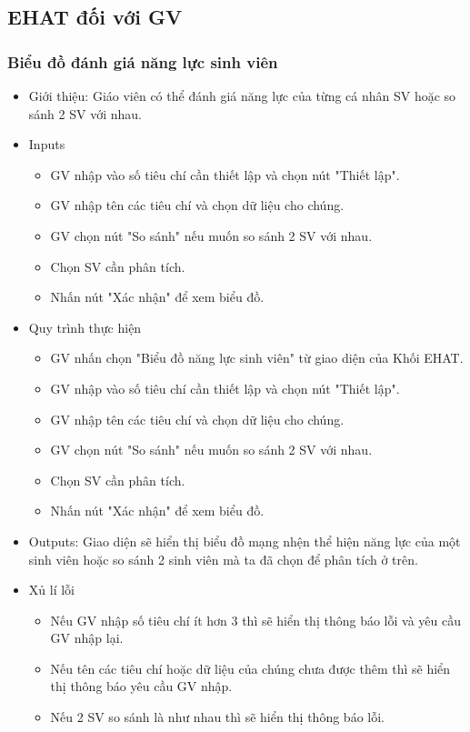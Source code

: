 \subsection{EHAT đối với GV}
\subsubsection{Biểu đồ đánh giá năng lực sinh viên}
\begin{itemize}
	\item Giới thiệu: Giáo viên có thể đánh giá năng lực của từng cá nhân SV hoặc so sánh 2 SV với nhau.
	\item Inputs
	\begin{itemize}
		\item GV nhập vào số tiêu chí cần thiết lập và chọn nút "Thiết lập".
		\item GV nhập tên các tiêu chí và chọn dữ liệu cho chúng.
		\item GV chọn nút "So sánh" nếu muốn so sánh 2 SV với nhau.
		\item Chọn SV cần phân tích.
		\item Nhấn nút "Xác nhận" để xem biểu đồ.
	\end{itemize}
	\item Quy trình thực hiện
	\begin{itemize}
		\item GV nhấn chọn "Biểu đồ năng lực sinh viên" từ giao diện của Khối EHAT.
		\item GV nhập vào số tiêu chí cần thiết lập và chọn nút "Thiết lập".
		\item GV nhập tên các tiêu chí và chọn dữ liệu cho chúng.
		\item GV chọn nút "So sánh" nếu muốn so sánh 2 SV với nhau.
		\item Chọn SV cần phân tích.
		\item Nhấn nút "Xác nhận" để xem biểu đồ.
	\end{itemize}
	\item Outputs: Giao diện sẽ hiển thị biểu đồ mạng nhện thể hiện năng lực của một sinh viên hoặc so sánh 2 sinh viên mà ta đã chọn để phân tích ở trên.
	\item Xủ lí lỗi
	\begin{itemize}
		\item Nếu GV nhập số tiêu chí ít hơn 3 thì sẽ hiển thị thông báo lỗi và yêu cầu GV nhập lại.
		\item Nếu tên các tiêu chí hoặc dữ liệu của chúng chưa được thêm thì sẽ hiển thị thông báo yêu cầu GV nhập.
		\item Nếu 2 SV so sánh là như nhau thì sẽ hiển thị thông báo lỗi.
	\end{itemize}
\end{itemize}

